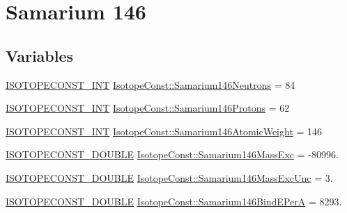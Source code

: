 \hypertarget{group___isotope_const-_samarium-_sm146}{}\section{Samarium 146}
\label{group___isotope_const-_samarium-_sm146}
\subsection*{Variables}
\begin{DoxyCompactItemize}
\item 
\mbox{\hyperlink{group___isotope_const-_macros_ga5f18360b3e99483a35c32d789e62621c}{I\+S\+O\+T\+O\+P\+E\+C\+O\+N\+S\+T\+\_\+\+I\+NT}} \mbox{\hyperlink{group___isotope_const-_samarium-_sm146_ga713ba3808e9002f34e60dc88c1a12ca5}{Isotope\+Const\+::\+Samarium146\+Neutrons}} = 84
\item 
\mbox{\hyperlink{group___isotope_const-_macros_ga5f18360b3e99483a35c32d789e62621c}{I\+S\+O\+T\+O\+P\+E\+C\+O\+N\+S\+T\+\_\+\+I\+NT}} \mbox{\hyperlink{group___isotope_const-_samarium-_sm146_ga92649477c205de96de2b2e035f341fac}{Isotope\+Const\+::\+Samarium146\+Protons}} = 62
\item 
\mbox{\hyperlink{group___isotope_const-_macros_ga5f18360b3e99483a35c32d789e62621c}{I\+S\+O\+T\+O\+P\+E\+C\+O\+N\+S\+T\+\_\+\+I\+NT}} \mbox{\hyperlink{group___isotope_const-_samarium-_sm146_ga75fcf00295df3b35479e52fff83e56d9}{Isotope\+Const\+::\+Samarium146\+Atomic\+Weight}} = 146
\item 
\mbox{\hyperlink{group___isotope_const-_macros_ga8f45a7272ce02c0b4c65c44636ed719a}{I\+S\+O\+T\+O\+P\+E\+C\+O\+N\+S\+T\+\_\+\+D\+O\+U\+B\+LE}} \mbox{\hyperlink{group___isotope_const-_samarium-_sm146_ga35f72472f3eb8d8722c2fa49374870a0}{Isotope\+Const\+::\+Samarium146\+Mass\+Exc}} = -\/80996.
\item 
\mbox{\hyperlink{group___isotope_const-_macros_ga8f45a7272ce02c0b4c65c44636ed719a}{I\+S\+O\+T\+O\+P\+E\+C\+O\+N\+S\+T\+\_\+\+D\+O\+U\+B\+LE}} \mbox{\hyperlink{group___isotope_const-_samarium-_sm146_ga5b919d73732fe20d9ca60533457b18a7}{Isotope\+Const\+::\+Samarium146\+Mass\+Exc\+Unc}} = 3.
\item 
\mbox{\hyperlink{group___isotope_const-_macros_ga8f45a7272ce02c0b4c65c44636ed719a}{I\+S\+O\+T\+O\+P\+E\+C\+O\+N\+S\+T\+\_\+\+D\+O\+U\+B\+LE}} \mbox{\hyperlink{group___isotope_const-_samarium-_sm146_gafa6beed126e212af8c22d78de50978df}{Isotope\+Const\+::\+Samarium146\+Bind\+E\+PerA}} = 8293.
\item 

\end{DoxyCompactItemize}
